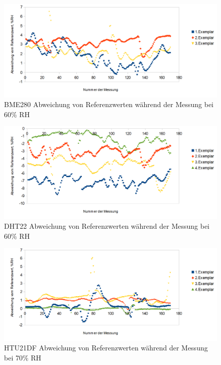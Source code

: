 \documentclass[runningheads]{llncs}
\begin{document}
\begin{figure}[h]
\includegraphics[width=\textwidth]{pictures/BME280_60.png}
\caption{BME280 Abweichung von Referenzwerten während der Messung bei 60\% RH}
\end{figure}

\begin{figure}[h]
\includegraphics[width=\textwidth]{pictures/DHT22_60.png}
\caption{DHT22 Abweichung von Referenzwerten während der Messung bei 60\% RH}
\end{figure}

\begin{figure}[h]
\includegraphics[width=\textwidth]{pictures/HTU21D_70.png}
\caption{HTU21DF Abweichung von Referenzwerten während der Messung bei 70\% RH}
\end{figure}
\end{document}
